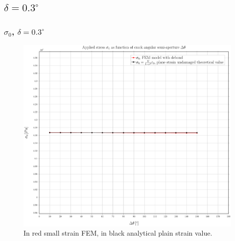 \documentclass[first,firstsupp,lastsupp,handout,last,hyperref,table]{ETHclass}
\begin{document}


\subsection{$\delta=0.3^{\circ}$}

\begin{frame}
\frametitle{\small $\sigma_{0}$, $\delta=0.3^{\circ}$}
\vspace{-0.5cm}
\centering
\captionsetup[figure]{font=scriptsize,labelfont=scriptsize}
\begin{figure}[!h]
\centering
\includegraphics[height=0.7\textheight]{2017-07-10_AbqRunSummary_SmallStrainD03_sigma-inf_Summary.pdf}
  \caption{\scriptsize In red small strain FEM, in black analytical plain strain value.}
  \label{fig:res1}
\end{figure}
\end{frame}
\end{document}
